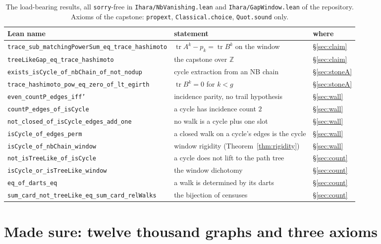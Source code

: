 \documentclass[11pt]{article}
\newcommand{\lean}[1]{\texttt{#1}}
\newcommand{\Z}{\mathbb{Z}}
\DeclareMathOperator{\tr}{tr}
\begin{document}
\begin{table}[t]
\centering\small
{}
\begin{tabular}{@{}lll@{}}
\toprule
\rowcolor{ggteal!18} Lean name & statement & where \\
\midrule
\lean{trace\_sub\_matchingPowerSum\_eq\_trace\_hashimoto} & $\tr A^k - p_k = \tr B^k$ on the window & \S\ref{sec:claim} \\
\lean{treeLikeGap\_eq\_trace\_hashimoto} & the capstone over $\Z$ & \S\ref{sec:claim} \\
\lean{exists\_isCycle\_of\_nbChain\_of\_not\_nodup} & cycle extraction from an NB chain & \S\ref{sec:stoneA} \\
\lean{trace\_hashimoto\_pow\_eq\_zero\_of\_lt\_egirth} & $\tr B^k = 0$ for $k < g$ & \S\ref{sec:stoneA} \\
\lean{even\_countP\_edges\_iff'} & incidence parity, no trail hypothesis & \S\ref{sec:wall} \\
\lean{countP\_edges\_of\_isCycle} & a cycle has incidence count $2$ & \S\ref{sec:wall} \\
\lean{not\_closed\_of\_isCycle\_edges\_add\_one} & no walk is a cycle plus one slot & \S\ref{sec:wall} \\
\lean{isCycle\_of\_edges\_perm} & a closed walk on a cycle's edges is the cycle & \S\ref{sec:wall} \\
\lean{isCycle\_of\_nbChain\_window} & window rigidity (Theorem~\ref{thm:rigidity}) & \S\ref{sec:wall} \\
\lean{not\_isTreeLike\_of\_isCycle} & a cycle does not lift to the path tree & \S\ref{sec:count} \\
\lean{isCycle\_or\_isTreeLike\_window} & the window dichotomy & \S\ref{sec:count} \\
\lean{eq\_of\_darts\_eq} & a walk is determined by its darts & \S\ref{sec:count} \\
\lean{sum\_card\_not\_treeLike\_eq\_sum\_card\_relWalks} & the bijection of censuses & \S\ref{sec:count} \\
\bottomrule
\end{tabular}
\caption{The load-bearing results, all \lean{sorry}-free in
\lean{Ihara/NbVanishing.lean} and \lean{Ihara/GapWindow.lean} of the repository. Axioms of
the capstone: \lean{propext}, \lean{Classical.choice}, \lean{Quot.sound} only.}
\label{tab:results}
\end{table}

\section{Made sure: twelve thousand graphs and three axioms}
\label{sec:verification}
\end{document}
